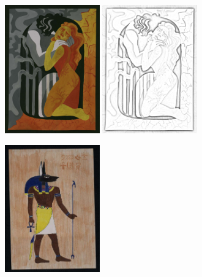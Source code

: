 \begin{figure}
\begin{subfigure}[b]{0.5\textwidth}
         \caption{}
     \end{subfigure}
     \hfil
     \begin{subfigure}[b]{0.5\textwidth}
         \centering
         \includegraphics[width=0.45\textwidth]{images/style_augments/2020_14-17_2051_UKR_R_C.jpg}\hfil
         \includegraphics[width=0.45\textwidth]{images/style_augments/2020_14-17_2051_UKR_R_C_pencil_gray.jpg}
         \caption{}
     \end{subfigure}
     \hfil
     \begin{subfigure}[b]{0.5\textwidth}
         \centering
         \includegraphics[width=0.45\textwidth]{images/style_augments/2019_14-17_0188_RUS_R_C.jpg}\hfil

\end{subfigure}
\end{figure}
